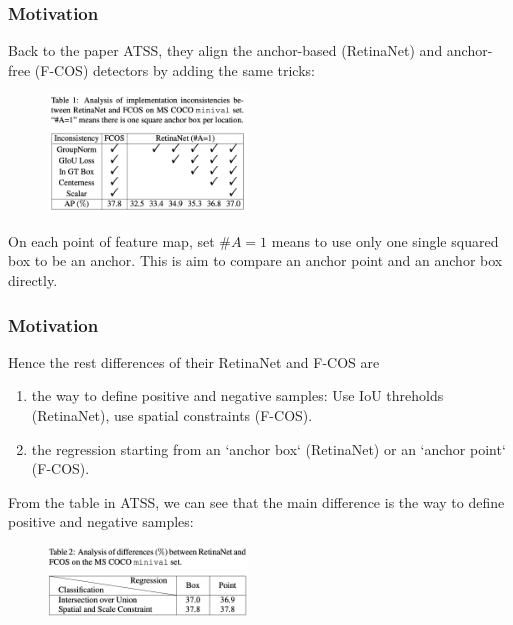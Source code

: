 \documentclass[slidetop, mathserif, dvipsnames]{beamer}
\begin{document}
\begin{frame}
    \frametitle{Motivation}

    Back to the paper ATSS, they align the anchor-based (RetinaNet)
    and anchor-free (F-COS) detectors by adding the same tricks:

    \begin{figure}
    \includegraphics[width=150pt]{pics/atss_compare.png}
    \end{figure}

    On each point of feature map, set $\#A=1$ means
    to use only one single squared box to be an anchor.
    This is aim to compare an anchor point and an anchor box directly.


\end{frame}

\begin{frame}
    \frametitle{Motivation}

    Hence the rest differences of their RetinaNet and F-COS are
    \begin{enumerate}
        \item the way to define positive and negative samples: Use IoU threholds (RetinaNet),
            use spatial constraints (F-COS).
        \item the regression starting from an `anchor box` (RetinaNet)
              or an `anchor point` (F-COS).
    \end{enumerate}

    From the table in ATSS, we can see that the main difference
    is the way to define positive and negative samples:
    \begin{figure}
    \includegraphics[width=150pt]{pics/atss_compare2.png}
    \end{figure}

\end{frame}
\end{document}
